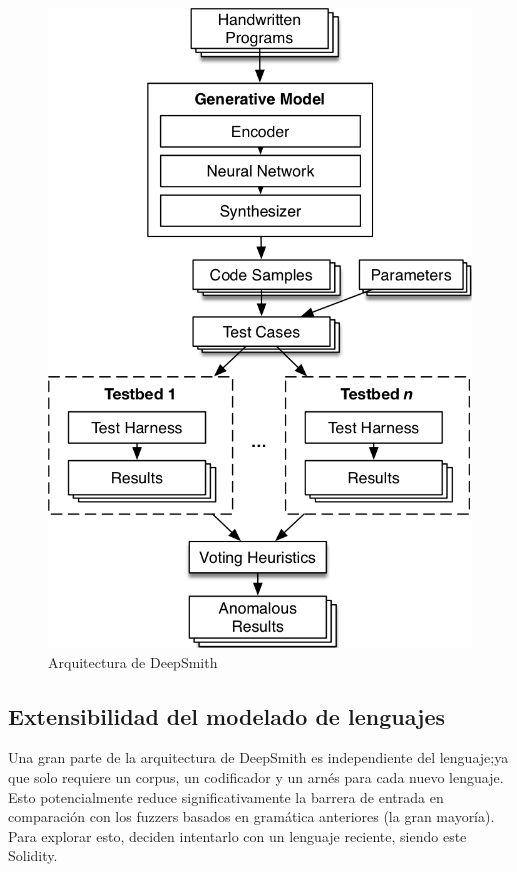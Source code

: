 \begin{figure}[h]
    \centering
    \includegraphics[scale=0.5]{images/deepsmith1.png}
    \caption{Arquitectura de DeepSmith}
    \label{fig:deepsmith architecture}
\end{figure}


\subsection{Extensibilidad del modelado de lenguajes}

Una gran parte de la arquitectura de DeepSmith es independiente del lenguaje;ya que solo requiere un corpus, un codificador y un arnés para cada nuevo lenguaje. Esto potencialmente reduce  significativamente la barrera de entrada en comparación con los fuzzers basados en gramática anteriores (la gran mayoría). Para explorar esto, deciden intentarlo con un lenguaje reciente, siendo este Solidity.

